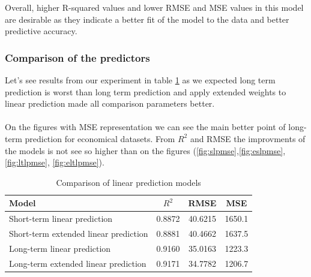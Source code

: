         \newpage
        Overall, higher R-squared values and lower RMSE and MSE values in this model are
        desirable as they indicate a better fit of the model to the data and better predictive accuracy.
        \subsubsection{Comparison of the predictors} \label{subsec:res_comparison}
        Let's see results from our experiment in table \ref{tab:model_comparison} as we expected
        long term prediction is worst than long term prediction and apply extended weights to
        linear prediction made all comparison parameters better.\\
        \\
        On the figures with MSE representation we can see the main better point of long-term
        prediction for economical datasets. From $R^2$ and RMSE the improvments of the models is not
        see so higher than on the figures (\ref{fig:slpmse},\ref{fig:eslpmse},\ref{fig:ltlpmse}, \ref{fig:eltlpmse}).
        \begin{table}[!ht]
            \centering
            \begin{tabular}{|l|c|c|c|}
                \hline
                Model & $R^2$ & RMSE & MSE \\
                \hline
                Short-term linear prediction & 0.8872 & 40.6215 & 1650.1 \\
                Short-term extended linear prediction & 0.8881 & 40.4662 & 1637.5 \\
                Long-term linear prediction & 0.9160 & 35.0163 & 1223.3 \\
                Long-term extended linear prediction & 0.9171 & 34.7782 & 1206.7 \\
                \hline
            \end{tabular}
            \caption{Comparison of linear prediction models}
            \label{tab:model_comparison}
        \end{table}

